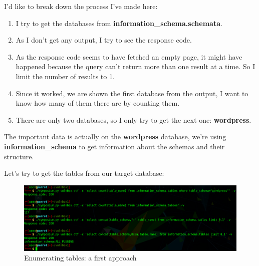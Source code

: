 \documentclass[12pt]{article}
\begin{document}
    I'd like to break down the process I've made here:
    \begin{enumerate}
        \item I try to get the databases from
            \textbf{information\_schema.schemata}.
        \item As I don't get any output, I try to see the response code.
        \item As the response code seems to have fetched an empty page, it
            might have happened because the query can't return more than one
            result at a time. So I limit the number of results to 1.
        \item Since it worked, we are shown the first database from the output,
            I want to know how many of them there are by counting them.
        \item There are only two databases, so I only try to get the next one:
            \textbf{wordpress}.
    \end{enumerate}

    The important data is actually on the \textbf{wordpress} database, we're 
    using \textbf{information\_schema} to get information about the schemas and
    their structure.

    Let's try to get the tables from our target database:

    \begin{figure}[H]\label{pic:27-exploit-tables-1}
        \centering
        \includegraphics[width=1.00\textwidth]{27-exploit-tables-1.png}
        \caption{Enumerating tables: a first approach}
    \end{figure}
\end{document}
